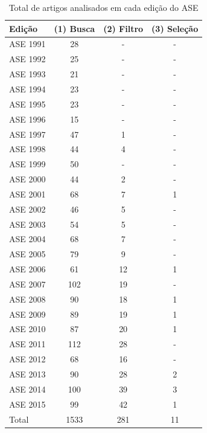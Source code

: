 \begin{table}[H]
\caption{Total de artigos analisados em cada edição do ASE}
\centering
\begin{tabular}{| l | c | c | c |}
\hline
Edição & (1) Busca & (2) Filtro & (3) Seleção \\
\hline
ASE 1991 & 28    & -         & -           \\
ASE 1992 & 25    & -         & -           \\
ASE 1993 & 21    & -         & -           \\
ASE 1994 & 23    & -         & -           \\
ASE 1995 & 23    & -         & -           \\
ASE 1996 & 15    & -         & -           \\
ASE 1997 & 47    & 1         & -           \\
ASE 1998 & 44    & 4         & -           \\
ASE 1999 & 50    & -         & -           \\
ASE 2000 & 44    & 2         & -           \\
ASE 2001 & 68    & 7         & 1           \\
ASE 2002 & 46    & 5         & -           \\
ASE 2003 & 54    & 5         & -           \\
ASE 2004 & 68    & 7         & -           \\
ASE 2005 & 79    & 9         & -           \\
ASE 2006 & 61    & 12        & 1           \\
ASE 2007 & 102   & 19        & -           \\
ASE 2008 & 90    & 18        & 1           \\
ASE 2009 & 89    & 19        & 1           \\
ASE 2010 & 87    & 20        & 1           \\
ASE 2011 & 112   & 28        & -           \\
ASE 2012 & 68    & 16        & -           \\
ASE 2013 & 90    & 28        & 2           \\
ASE 2014 & 100   & 39        & 3           \\
ASE 2015 & 99    & 42        & 1           \\
\hline
Total    & 1533  & 281       & 11          \\
\hline
\end{tabular}
\label{artigos-do-ase}
\end{table}

